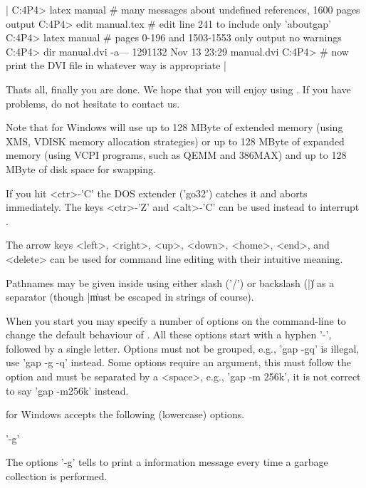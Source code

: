 |    C:\GAPR4P4\DOC > latex manual
    # many messages about undefined references, 1600 pages output	
    C:\GAPR4P4\DOC > edit manual.tex
    # edit line 241 to include only 'aboutgap'
    C:\GAPR4P4\DOC > latex manual
    # pages 0-196 and 1503-1553 only output no warnings
    C:\GAPR4P4\DOC > dir manual.dvi
    -a---   1291132 Nov 13 23:29 manual.dvi
    C:\GAPR4P4\DOC > 
    # now print the DVI file in whatever way is appropriate
|


Thats  all, finally you  are  done.  We  hope  that you  will enjoy using
{\GAP}.  If you have problems, do not hesitate to contact us.

%
%

Note that {\GAP} for Windows  will use up to  128 MByte of extended memory
(using XMS, VDISK memory  allocation strategies) or  up  to 128  MByte of
expanded memory (using VCPI programs, such as QEMM  and 386MAX) and up to
128 MByte of disk space for swapping.

If you hit  <ctr>-'C'  the DOS extender  ('go32')  catches it and  aborts
{\GAP} immediately.  The keys <ctr>-'Z' and <alt>-'C' can be used instead
to interrupt {\GAP}.

The arrow keys <left>, <right>, <up>, <down>, <home>, <end>, and <delete>
can be used for command line editing with their intuitive meaning.

Pathnames may  be  given   inside {\GAP}  using  either  slash  ('/')  or
backslash (|\|) as a separator (though |\|  must be escaped in strings of
course).

When  you  start  {\GAP}  you  may specify a  number   of options  on the
command-line to  change the  default   behaviour of {\GAP}.   All   these
options start with a  hyphen '-', followed  by a single  letter.  Options
must not  be   grouped, e.g., 'gap -gq'    is illegal, use  'gap  -g  -q'
instead.  Some  options require an argument,  this must follow the option
and must   be separated by   a <space>, e.g., 'gap  -m  256k', it  is not
correct to say 'gap -m256k' instead.

{\GAP} for Windows accepts the following (lowercase) options.

'-g'

The options '-g' tells {\GAP} to print a information message every time a
garbage collection is performed.

